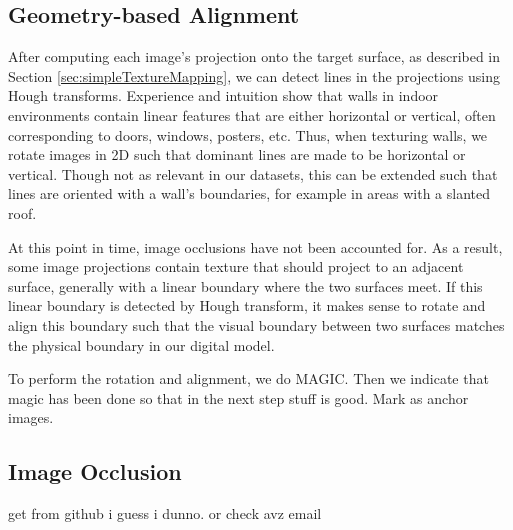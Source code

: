 \documentclass[]{spie}  %
\begin{document}
\subsection{Geometry-based Alignment}
\label{sec:projectionAndRotation}
After computing each image's projection onto the target surface, as
described in Section \ref{sec:simpleTextureMapping}, we can detect
lines in the projections using Hough transforms. Experience and
intuition show that walls in indoor environments contain linear
features that are either horizontal or vertical, often corresponding
to doors, windows, posters, etc. Thus, when texturing walls, we rotate
images in 2D such that dominant lines are made to be horizontal or
vertical. Though not as relevant in our datasets, this can be extended
such that lines are oriented with a wall's boundaries, for example in
areas with a slanted roof.

At this point in time, image occlusions have not been accounted
for. As a result, some image projections contain texture that should
project to an adjacent surface, generally with a linear boundary where
the two surfaces meet. If this linear boundary is detected by Hough
transform, it makes sense to rotate and align this boundary such that
the visual boundary between two surfaces matches the physical boundary
in our digital model.

To perform the rotation and alignment, we do MAGIC.  Then we indicate
that magic has been done so that in the next step stuff is good. Mark
as anchor images.

\subsection{Image Occlusion}
get from github i guess i dunno. or check avz email
\end{document}
